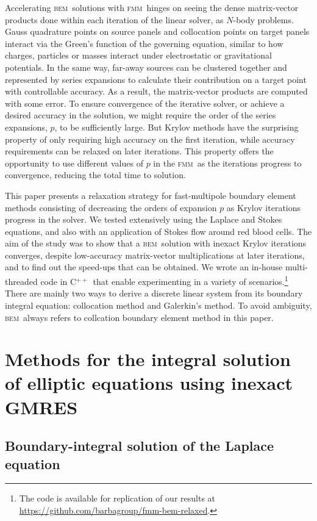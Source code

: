 \documentclass[final,3p,times]{elsarticle}
\newcommand{\bem}{\textsc{bem}\xspace}
\newcommand{\fmm}{\textsc{fmm}\xspace}
\newcommand{\cpp}{C$^{++}$}
\begin{document}
Accelerating \bem\ solutions with \fmm\ hinges on seeing the dense matrix-vector products done within each iteration of the linear solver, as $N$-body problems. Gauss quadrature points on source panels and collocation points on target panels interact via the Green's function of the governing equation, similar to how charges, particles or masses interact under electrostatic or gravitational potentials. In the same way, far-away sources can be clustered together and represented by series expansions to calculate their contribution on a target point with controllable accuracy. As a result, the matrix-vector products are computed with some error. To ensure convergence of the iterative solver, or achieve a desired accuracy in the solution, we might require the order of the series expansions, $p$, to be sufficiently large. But Krylov methods have the surprising property of only requiring high accuracy on the first iteration, while accuracy requirements can be relaxed on later iterations. This property offers the opportunity to use different values of $p$ in the \fmm\ as the iterations progress to convergence, reducing the total time to solution.

This paper presents a relaxation strategy for fast-multipole boundary element methods consisting of decreasing the orders of expansion $p$ as Krylov iterations progress in the solver. We tested extensively using the Laplace and Stokes equations, and also with an application of Stokes flow around red blood cells. The aim of the study was to show that a \bem\ solution with inexact Krylov iterations converges, despite low-accuracy matrix-vector multiplications at later iterations, and to find out the speed-ups that can be obtained. We wrote an in-house  multi-threaded code in \cpp\ that enable experimenting in a variety of scenarios.\footnote{The code is available for replication of our results at \href{https://github.com/barbagroup/fmm-bem-relaxed}{https://github.com/barbagroup/fmm-bem-relaxed}.} There are mainly two ways to derive a discrete linear system from its boundary integral equation: collocation method and Galerkin's method. To avoid ambiguity, \bem\ always refers to collcation boundary element method in this paper.

\section{Methods for the integral solution of elliptic equations using inexact {\small GMRES}}

\subsection{Boundary-integral solution of the Laplace equation}
\end{document}
